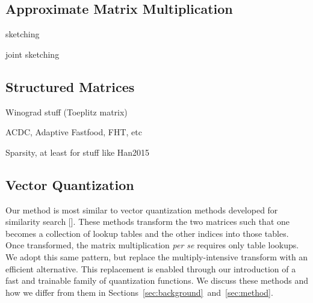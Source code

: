 



\subsection{Approximate Matrix Multiplication}

sketching

joint sketching

\subsection{Structured Matrices}

Winograd stuff (Toeplitz matrix)

ACDC, Adaptive Fastfood, FHT, etc

Sparsity, at least for stuff like Han2015

\subsection{Vector Quantization}

Our method is most similar to vector quantization methods developed for similarity search []. These methods transform the two matrices such that one becomes a collection of lookup tables and the other indices into those tables. Once transformed, the matrix multiplication \textit{per se} requires only table lookups. We adopt this same pattern, but replace the multiply-intensive transform with an efficient alternative. This replacement is enabled through our introduction of a fast and trainable family of quantization functions. We discuss these methods and how we differ from them in Sections~\ref{sec:background}~and~\ref{sec:method}.


